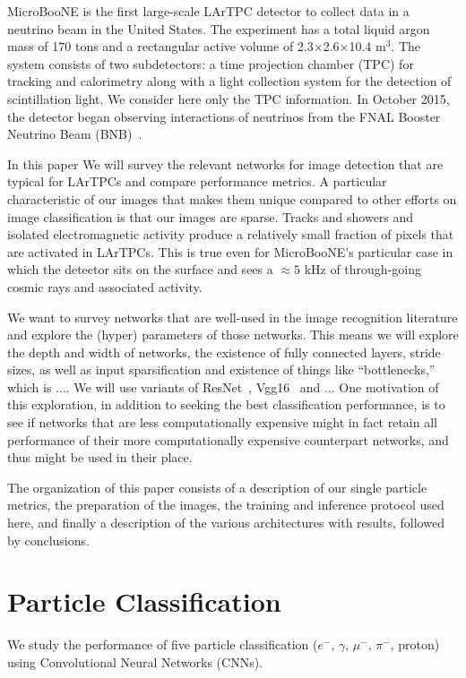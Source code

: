 \documentclass[11pt,a4paper]{article}
\begin{document}
MicroBooNE is the first large-scale LArTPC detector to collect data in a neutrino beam in the United States. The experiment has a total liquid argon mass of 170 tons and a rectangular active volume of 2.3$\times$2.6$\times$10.4 m$^3$. The system consists of two subdetectors: a time projection chamber (TPC) for tracking and calorimetry along with a light collection system for the detection of scintillation light. We consider here only the TPC information. In October 2015, the detector began observing interactions of neutrinos from the FNAL Booster Neutrino Beam (BNB)~\cite{BNB}.


In this paper We will survey the relevant networks for image detection that are typical for LArTPCs and compare performance metrics. A particular characteristic of our images that makes them unique compared to other efforts on image classification is that our images are sparse. Tracks and showers and isolated electromagnetic activity produce a relatively small fraction of pixels that are activated in LArTPCs. This is true even for MicroBooNE's particular case in which the detector sits on the surface and sees a $\approx 5 $ kHz of through-going cosmic rays and associated activity.

We want to survey networks that are well-used in the image recognition literature and explore the (hyper) parameters of those networks. This means we will explore the depth and width of networks, the existence of fully connected layers, stride sizes, as well as input sparsification and existence of things like ``bottlenecks,'' which is .... We will use variants of ResNet~\cite{}, Vgg16~\cite{} and ... One motivation of this exploration, in addition to seeking the best classification performance, is to see if networks that are less computationally expensive might in fact retain all performance of their more computationally expensive counterpart networks, and thus might be used in their place.

The organization of this paper consists of a description of our single particle metrics, the preparation of the images, the training and inference protocol used here, and finally a description of the various architectures with results, followed by conclusions.


\section{Particle Classification}

We study the performance of five particle classification ($e^-$, $\gamma$, $\mu^-$, $\pi^-$, proton) using Convolutional Neural Networks (CNNs).
\end{document}
